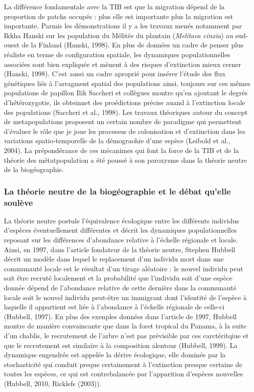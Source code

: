 La différence fondamentale avec la TIB est que la migration dépend de la
proportion de patchs occupés : plus elle est importante plus la
migration est importante. Parmis les démonstrations il y a les travaux
menés notamment par Ikkha Hanski sur les population du Mélitée du
plantain (\emph{Melitaea cinxia}) au sud-ouest de la Finland (Hanski,
1998). En plus de données un cadre de penser plus réaliste en terme de
configuration spatiale, les dynamiques populationnelles associées sont
bien expliquée et mènent à des risques d'extinction mieux cerner
(Hanski, 1998). C'est aussi un cadre aproprié pour insérer l'étude des
flux génétiques liés à l'arragment spatial des populations ainsi,
toujours sur ces mêmes populations de papillon Ilik Saccheri et
collègues montre qu'en ajoutant le degrés d'hétérozygotie, ils obteinnet
des proédictions précise auand à l'extinction locale des populations
(Saccheri et al., 1998). Les travaux théoriques autour du concept de
metapopulations proposent un certain nombre de paradigme qui permettent
d'évaluer le rôle que je joue les processus de colonisation et
d'extinction dans les variations spatio-temporelle de la démograohie
d'une espèce (Leibold et al., 2004). La prépondérance de ces mécanimes
qui font la force de la TIB et de la théorie des métatpopulation a été
poussé à son paroxysme dans la théorie neutre de la biogéographie.

\subsubsection*{La théorie neutre de la biogéographie et le débat
qu'elle
soulève}\label{la-thuxe9orie-neutre-de-la-bioguxe9ographie-et-le-duxe9bat-quelle-souluxe8ve}

La théorie neutre postule l'équivalence écologique entre les différents
individus d'espèces éventuellement différentes et décrit les dynamiques
populationnelles reposant sur les différences d'abondance relative à
l'échelle régionale et locale. Ainsi, en 1997, dans l'article fondateur
de la théorie neutre, Stephen Hubbell décrit un modèle dans lequel le
replacement d'un individu mort dans une communauté locale est le
résultat d'un tirage aléatoire : le nouvel individu peut soit être
recruté localement et la probabilité que l'individu soit d'une espèce
donnée dépend de l'abondance relative de cette dernière dans la
communauté locale soit le nouvel individu peut-être un immigrant dont
l'identité de l'espèce à laquelle il appartient est liée à l'abondance à
l'échelle régionale de celle-ci (Hubbell, 1997). En plus des exenples
données dans l'article de 1997, Hubbell montre de manière convaincante
que dans la foret tropical du Panama, à la suite d'un chablis, le
recrutement de l'arbre n'est pas prévisible par ces carctéritqiue et que
le recrutement est similaire à la composition alentour (Hubbell, 1999).
La dynamique engendrée est appelée la dérive écologique, elle dominée
par la stochasticité qui conduit preque certainement à l'extinction
presque certaine de toutes les espèces, ce qui est contrebalancée par
l'apparition d'espèces nouvelles (Hubbell, 2010, Ricklefs (2003)).

